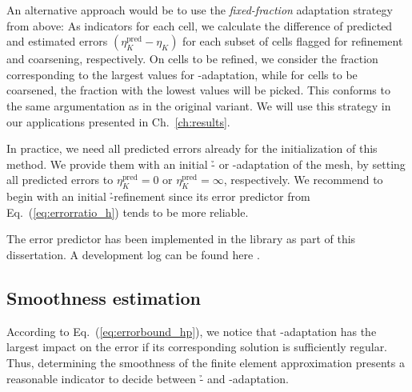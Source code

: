 An alternative approach would be to use the \textit{fixed-fraction} adaptation strategy from above: As indicators for each cell, we calculate the difference of predicted and estimated errors $(\eta_K^\text{pred} - \eta_K)$ for each subset of cells flagged for refinement and coarsening, respectively. On cells to be refined, we consider the fraction corresponding to the largest values for \p-adaptation, while for cells to be coarsened, the fraction with the lowest values will be picked. This conforms to the same argumentation as in the original variant. We will use this strategy in our applications presented in Ch.~\ref{ch:results}.

In practice, we need all predicted errors already for the initialization of this method. We provide them with an initial \h- or \p-adaptation of the mesh, by setting all predicted errors to $\eta_K^\text{pred} = 0$ or $\eta_K^\text{pred} = \infty$, respectively. We recommend to begin with an initial \h-refinement since its error predictor from Eq.~(\ref{eq:errorratio_h}) tends to be more reliable.

The error predictor has been implemented in the \dealii{} library as part of this dissertation. A development log can be found here \textcite{dealiipr8341}.



\subsection{Smoothness estimation}
\label{ssec:smoothness}

According to Eq.~(\ref{eq:errorbound_hp}), we notice that \p-adaptation has the largest impact on the error if its corresponding solution is sufficiently regular. Thus, determining the smoothness of the finite element approximation presents a reasonable indicator to decide between \h- and \p-adaptation.

